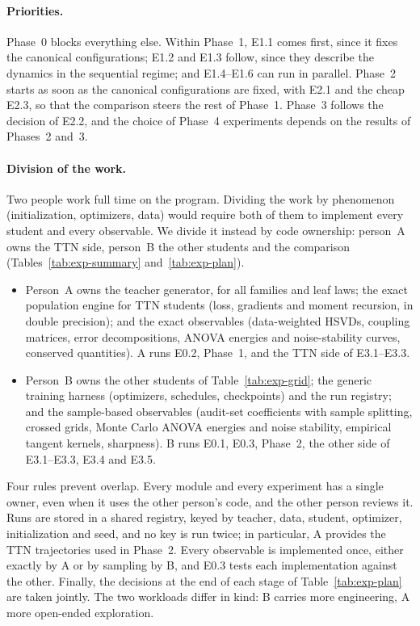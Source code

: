\documentclass[11pt]{article}
\theoremstyle{definition}
\numberwithin{equation}{section}
\begin{document}
\paragraph{Priorities.}
Phase~0 blocks everything else. Within Phase~1, E1.1 comes first, since it fixes the canonical configurations; E1.2 and E1.3 follow, since they describe the dynamics in the sequential regime; and E1.4--E1.6 can run in parallel. Phase~2 starts as soon as the canonical configurations are fixed, with E2.1 and the cheap E2.3, so that the comparison steers the rest of Phase~1. Phase~3 follows the decision of E2.2, and the choice of Phase~4 experiments depends on the results of Phases~2 and~3.

\paragraph{Division of the work.}
Two people work full time on the program. Dividing the work by phenomenon (initialization, optimizers, data) would require both of them to implement every student and every observable. We divide it instead by code ownership: person~A owns the TTN side, person~B the other students and the comparison (Tables~\ref{tab:exp-summary} and~\ref{tab:exp-plan}).
\begin{itemize}[nosep]
\item Person~A owns the teacher generator, for all families and leaf laws; the exact population engine for TTN students (loss, gradients and moment recursion, in double precision); and the exact observables (data-weighted HSVDs, coupling matrices, error decompositions, ANOVA energies and noise-stability curves, conserved quantities). A runs E0.2, Phase~1, and the TTN side of E3.1--E3.3.
\item Person~B owns the other students of Table~\ref{tab:exp-grid}; the generic training harness (optimizers, schedules, checkpoints) and the run registry; and the sample-based observables (audit-set coefficients with sample splitting, crossed grids, Monte Carlo ANOVA energies and noise stability, empirical tangent kernels, sharpness). B runs E0.1, E0.3, Phase~2, the other side of E3.1--E3.3, E3.4 and E3.5.
\end{itemize}
Four rules prevent overlap. Every module and every experiment has a single owner, even when it uses the other person's code, and the other person reviews it. Runs are stored in a shared registry, keyed by teacher, data, student, optimizer, initialization and seed, and no key is run twice; in particular, A provides the TTN trajectories used in Phase~2. Every observable is implemented once, either exactly by A or by sampling by B, and E0.3 tests each implementation against the other. Finally, the decisions at the end of each stage of Table~\ref{tab:exp-plan} are taken jointly. The two workloads differ in kind: B carries more engineering, A more open-ended exploration.
\end{document}
